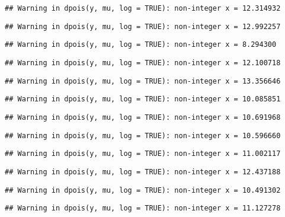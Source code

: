 \documentclass[
]{article}
\begin{document}
\begin{verbatim}
## Warning in dpois(y, mu, log = TRUE): non-integer x = 12.314932
\end{verbatim}

\begin{verbatim}
## Warning in dpois(y, mu, log = TRUE): non-integer x = 12.992257
\end{verbatim}

\begin{verbatim}
## Warning in dpois(y, mu, log = TRUE): non-integer x = 8.294300
\end{verbatim}

\begin{verbatim}
## Warning in dpois(y, mu, log = TRUE): non-integer x = 12.100718
\end{verbatim}

\begin{verbatim}
## Warning in dpois(y, mu, log = TRUE): non-integer x = 13.356646
\end{verbatim}

\begin{verbatim}
## Warning in dpois(y, mu, log = TRUE): non-integer x = 10.085851
\end{verbatim}

\begin{verbatim}
## Warning in dpois(y, mu, log = TRUE): non-integer x = 10.691968
\end{verbatim}

\begin{verbatim}
## Warning in dpois(y, mu, log = TRUE): non-integer x = 10.596660
\end{verbatim}

\begin{verbatim}
## Warning in dpois(y, mu, log = TRUE): non-integer x = 11.002117
\end{verbatim}

\begin{verbatim}
## Warning in dpois(y, mu, log = TRUE): non-integer x = 12.437188
\end{verbatim}

\begin{verbatim}
## Warning in dpois(y, mu, log = TRUE): non-integer x = 10.491302
\end{verbatim}

\begin{verbatim}
## Warning in dpois(y, mu, log = TRUE): non-integer x = 11.127278
\end{verbatim}
\end{document}
